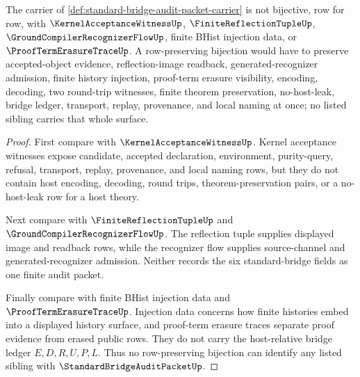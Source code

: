 \begin{theorem}
\label{thm:standard-bridge-audit-packet-independence}
The carrier of \autoref{def:standard-bridge-audit-packet-carrier} is not bijective, row for row, with $\KernelAcceptanceWitnessUp$, $\FiniteReflectionTupleUp$, $\GroundCompilerRecognizerFlowUp$, finite BHist injection data, or $\ProofTermErasureTraceUp$. A row-preserving bijection would have to preserve accepted-object evidence, reflection-image readback, generated-recognizer admission, finite history injection, proof-term erasure visibility, encoding, decoding, two round-trip witnesses, finite theorem preservation, no-host-leak, bridge ledger, transport, replay, provenance, and local naming at once; no listed sibling carries that whole surface.
\end{theorem}
\begin{proof}
First compare with $\KernelAcceptanceWitnessUp$. Kernel acceptance witnesses expose candidate, accepted declaration, environment, purity-query, refusal, transport, replay, provenance, and local naming rows, but they do not contain host encoding, decoding, round trips, theorem-preservation pairs, or a no-host-leak row for a host theory.

Next compare with $\FiniteReflectionTupleUp$ and $\GroundCompilerRecognizerFlowUp$. The reflection tuple supplies displayed image and readback rows, while the recognizer flow supplies source-channel and generated-recognizer admission. Neither records the six standard-bridge fields as one finite audit packet.

Finally compare with finite BHist injection data and $\ProofTermErasureTraceUp$. Injection data concerns how finite histories embed into a displayed history surface, and proof-term erasure traces separate proof evidence from erased public rows. They do not carry the host-relative bridge ledger $E,D,R,U,P,L$. Thus no row-preserving bijection can identify any listed sibling with $\StandardBridgeAuditPacketUp$.
\end{proof}

